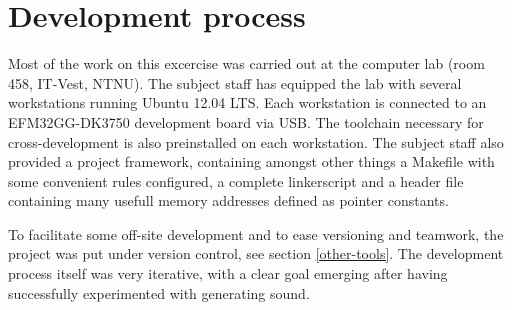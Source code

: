 \section{Development process}

Most of the work on this excercise was carried out at the computer lab (room 458, IT-Vest, NTNU). The subject staff has equipped the lab with several workstations running Ubuntu 12.04 LTS. Each workstation is connected to an EFM32GG-DK3750 development board via USB. The toolchain necessary for cross-development is also preinstalled on each workstation. The subject staff also provided a project framework, containing amongst other things a Makefile with some convenient rules configured, a complete linkerscript and a header file containing many usefull memory addresses defined as pointer constants.

To facilitate some off-site development and to ease versioning and teamwork, the project was put under version control, see section \ref{other-tools}. The development process itself was very iterative, with a clear goal emerging after having successfully experimented with generating sound.


